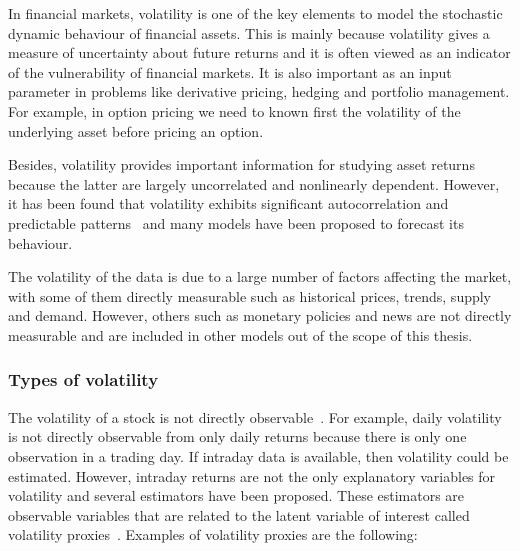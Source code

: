 In financial markets, volatility is one of the key elements to model the
stochastic dynamic behaviour of financial assets. This is mainly because
volatility gives a measure of uncertainty about future returns and it is often
viewed as an indicator of the vulnerability of financial markets. It is also
important as an input parameter in problems like derivative pricing, hedging
and portfolio management.  For example, in option pricing we need to known
first the volatility of the underlying asset before pricing an option. 

Besides, volatility provides important information for studying asset returns
because the latter are largely uncorrelated and nonlinearly dependent. However,
it has been found that volatility exhibits significant autocorrelation and
predictable patterns~\cite{poon+granger2003} and  many models have been
proposed to forecast its behaviour. 

The volatility of the data is due to a large number of factors affecting the
market, with some of them directly measurable such as historical prices,
trends, supply and demand. However, others such as monetary policies and news
are not directly measurable and are included in other models out of the scope
of this thesis. 


\subsubsection{Types of volatility}

The volatility of a stock is not directly observable~\cite{tsay2005,engle1993}. For example, daily volatility is not directly observable from only daily returns because there is only one observation in a trading day.  If intraday data is available, then volatility could be estimated. However, intraday returns are not the only explanatory variables for volatility and several estimators have been proposed. These estimators are observable variables that are related to the latent variable of interest called volatility proxies~\cite{devilderetal2007}. Examples of volatility proxies are the following: 


